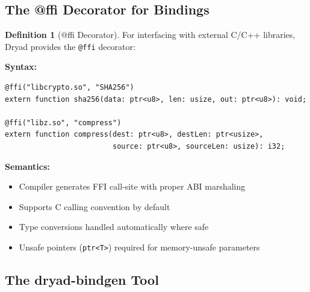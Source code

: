 \documentclass[12pt,a4paper]{article}
\theoremstyle{definition}
\newtheorem{definition}{Definition}[section]
\begin{document}
\subsection{The @ffi Decorator for Bindings}

\begin{definition}[@ffi Decorator]
For interfacing with external C/C++ libraries, Dryad provides the \texttt{@ffi} decorator:

\textbf{Syntax:}
\begin{lstlisting}[language=Dryad]
@ffi("libcrypto.so", "SHA256")
extern function sha256(data: ptr<u8>, len: usize, out: ptr<u8>): void;

@ffi("libz.so", "compress")
extern function compress(dest: ptr<u8>, destLen: ptr<usize>, 
                         source: ptr<u8>, sourceLen: usize): i32;
\end{lstlisting}

\textbf{Semantics:}
\begin{itemize}[leftmargin=*]
    \item Compiler generates FFI call-site with proper ABI marshaling
    \item Supports C calling convention by default
    \item Type conversions handled automatically where safe
    \item Unsafe pointers (\texttt{ptr<T>}) required for memory-unsafe parameters
\end{itemize}
\end{definition}

\subsection{The dryad-bindgen Tool}
\end{document}
